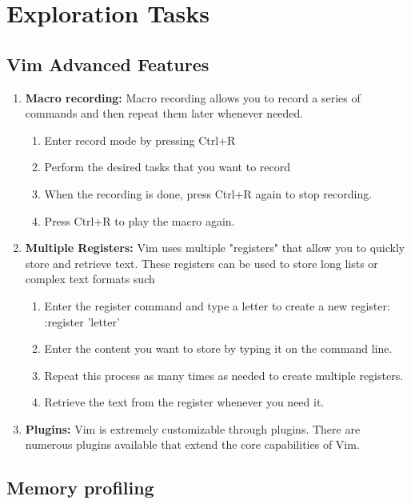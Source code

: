 \documentclass[12pt]{article}
\begin{document}
\section{Exploration Tasks}
\subsection{Vim Advanced Features}
\begin{enumerate}
    \item \textbf{Macro recording:} Macro recording allows you to record a series of commands and then repeat them later whenever needed.
        \begin{enumerate}
            \item Enter record mode by pressing Ctrl+R
            \item Perform the desired tasks that you want to record
            \item When the recording is done, press Ctrl+R again to stop recording.
            \item Press Ctrl+R to play the macro again.
        \end{enumerate}

    \item \textbf{Multiple Registers:} Vim uses multiple "registers" that allow you to quickly store and retrieve text. These registers can be used to store long lists or complex text formats such 
        \begin{enumerate}
            \item Enter the register command and type a letter to create a new register:\\
            :register 'letter'
            \item Enter the content you want to store by typing it on the command line.
            \item Repeat this process as many times as needed to create multiple registers.
            \item Retrieve the text from the register whenever you need it.
        \end{enumerate}

    \item \textbf{Plugins:} Vim is extremely customizable through plugins. There are numerous plugins available that extend the core capabilities of Vim.
\end{enumerate}

\subsection{Memory profiling}
\end{document}
